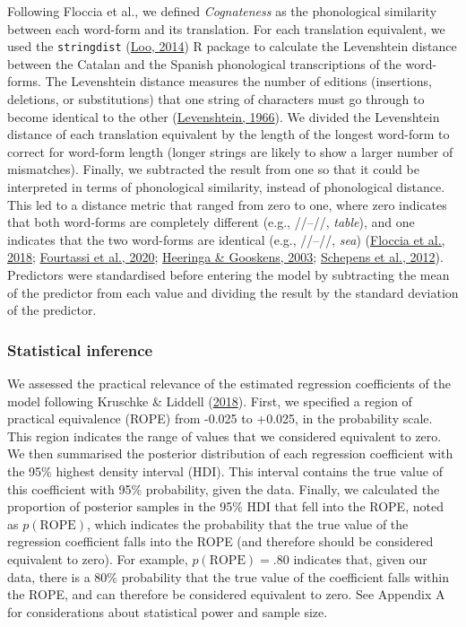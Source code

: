 \documentclass[
]{article}
\begin{document}
Following Floccia et al., we defined \emph{Cognateness} as the
phonological similarity between each word-form and its translation. For
each translation equivalent, we used the \texttt{stringdist}
(\protect\hyperlink{ref-vanderloo2014stringdist}{Loo, 2014}) R package
to calculate the Levenshtein distance between the Catalan and the
Spanish phonological transcriptions of the word-forms. The Levenshtein
distance measures the number of editions (insertions, deletions, or
substitutions) that one string of characters must go through to become
identical to the other
(\protect\hyperlink{ref-levenshtein1966binary}{Levenshtein, 1966}). We
divided the Levenshtein distance of each translation equivalent by the
length of the longest word-form to correct for word-form length (longer
strings are likely to show a larger number of mismatches). Finally, we
subtracted the result from one so that it could be interpreted in terms
of phonological similarity, instead of phonological distance. This led
to a distance metric that ranged from zero to one, where zero indicates
that both word-forms are completely different (e.g.,
//--//, \emph{table}), and one
indicates that the two word-forms are identical (e.g.,
//--//, \emph{sea})
(\protect\hyperlink{ref-floccia2018introduction}{Floccia et al., 2018};
\protect\hyperlink{ref-fourtassi2020growth}{Fourtassi et al., 2020};
\protect\hyperlink{ref-heeringa2003norwegian}{Heeringa \& Gooskens,
2003}; \protect\hyperlink{ref-schepens2012distributions}{Schepens et
al., 2012}). Predictors were standardised before entering the model by
subtracting the mean of the predictor from each value and dividing the
result by the standard deviation of the predictor.

\hypertarget{statistical-inference}{%
\subsubsection{Statistical inference}\label{statistical-inference}}

We assessed the practical relevance of the estimated regression
coefficients of the model following Kruschke \& Liddell
(\protect\hyperlink{ref-kruschke2018bayesian}{2018}). First, we
specified a region of practical equivalence (ROPE) from -0.025 to
+0.025, in the probability scale. This region indicates the range of
values that we considered equivalent to zero. We then summarised the
posterior distribution of each regression coefficient with the 95\%
highest density interval (HDI). This interval contains the true value of
this coefficient with 95\% probability, given the data. Finally, we
calculated the proportion of posterior samples in the 95\% HDI that fell
into the ROPE, noted as \(p(\text{ROPE})\), which indicates the
probability that the true value of the regression coefficient falls into
the ROPE (and therefore should be considered equivalent to zero). For
example, \(p(\text{ROPE})=.80\) indicates that, given our data, there is
a 80\% probability that the true value of the coefficient falls within
the ROPE, and can therefore be considered equivalent to zero. See
Appendix A for considerations about statistical power and sample size.
\end{document}
